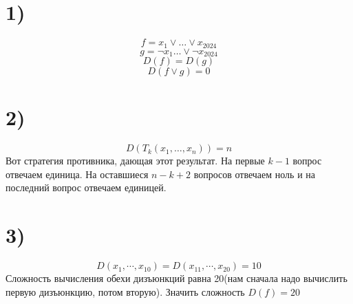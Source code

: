 

	\section*{1)}
	$$f  = x_1 \vee \dots \vee x_{2024}$$
	$$g =  \neg x_1\dots \vee \neg x_{2024}$$
	$$D(f) = D(g)$$
	$$D(f\vee g) = 0$$
	\section*{2)}
	
	$$D(T_k(x_1,\dots, x_n)) = n$$
	Вот стратегия противника, дающая этот результат. На первые $k-1$ вопрос отвечаем единица. На оставшиеся $n-k+2$ вопросов отвечаем ноль и на последний вопрос отвечаем единицей.
	 \section*{3)}
	 $$D(x_1,\cdots , x_{10} ) = D(x_{11},\cdots , x_{20} ) = 10$$
	 Сложность вычисления обехи дизъюнкций равна 20(нам сначала надо вычислить первую дизъюнкцию, потом вторую). Значить сложность $D(f) = 20$
